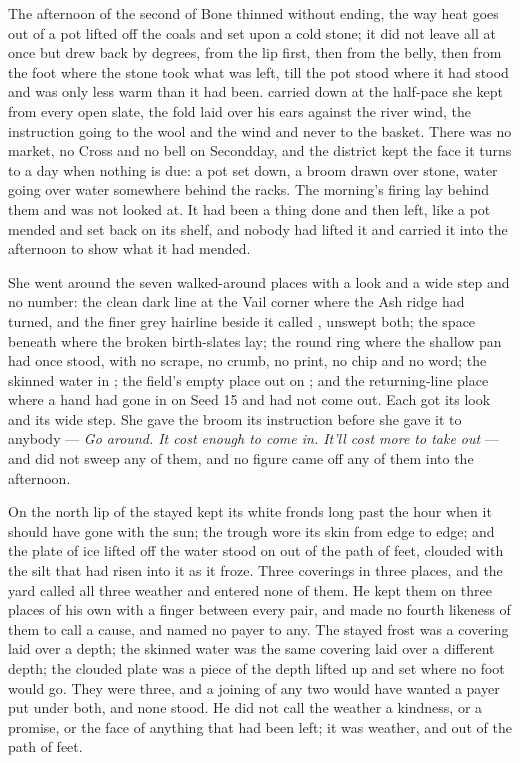 The afternoon of the second of Bone thinned without ending, the way heat goes out of a pot lifted off the coals and set upon a cold stone; it did not leave all at once but drew back by degrees, from the lip first, then from the belly, then from the foot where the stone took what was left, till the pot stood where it had stood and was only less warm than it had been.  carried  down at the half-pace she kept from every open slate, the fold laid over his ears against the river wind, the instruction going to the wool and the wind and never to the basket. There was no market, no Cross and no bell on Secondday, and the district kept the face it turns to a day when nothing is due: a pot set down, a broom drawn over stone, water going over water somewhere behind the racks. The morning's firing lay behind them and was not looked at. It had been a thing done and then left, like a pot mended and set back on its shelf, and nobody had lifted it and carried it into the afternoon to show what it had mended.

She went around the seven walked-around places with a look and a wide step and no number: the clean dark line at the Vail corner where the Ash ridge had turned, and the finer grey hairline beside it called , unswept both; the space beneath  where the broken birth-slates lay; the round ring where the shallow pan had once stood, with no scrape, no crumb, no print, no chip and no word; the skinned water in ; the field's empty place out on ; and the returning-line place where a hand had gone in on Seed 15 and had not come out. Each got its look and its wide step. She gave the broom its instruction before she gave it to anybody --- \emph{Go around. It cost enough to come in. It'll cost more to take out} --- and did not sweep any of them, and no figure came off any of them into the afternoon.

On the north lip of  the stayed  kept its white fronds long past the hour when it should have gone with the sun; the trough wore its skin from edge to edge; and the plate of ice lifted off the water stood on  out of the path of feet, clouded with the silt that had risen into it as it froze. Three coverings in three places, and the yard called all three weather and entered none of them. He kept them on three places of his own with a finger between every pair, and made no fourth likeness of them to call a cause, and named no payer to any. The stayed frost was a covering laid over a depth; the skinned water was the same covering laid over a different depth; the clouded plate was a piece of the depth lifted up and set where no foot would go. They were three, and a joining of any two would have wanted a payer put under both, and none stood. He did not call the weather a kindness, or a promise, or the face of anything that had been left; it was weather, and out of the path of feet.


